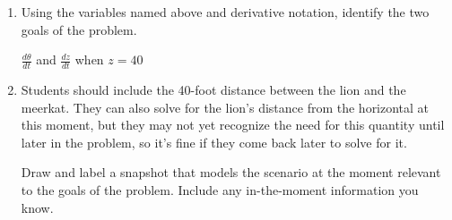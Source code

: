 \documentclass{article}
\begin{document}
\begin{enumerate}
\begin{enumerate}
    \begin{solution}
    \begin{center}
     \end{center}
    \end{solution}
    \vfill\vfill
    \item Using the variables named above and derivative notation, identify the two goals of the problem.
    
    \begin{solution}
        $\frac{d\theta}{dt}$ and $\frac{dz}{dt}$ when $z=40$
    \end{solution}
    \vfill
    \item 
    \begin{workshop}
        Students should include the 40-foot distance between the lion and the meerkat. They can also solve for the lion's distance from the horizontal at this moment, but they may not yet recognize the need for this quantity until later in the problem, so it's fine if they come back later to solve for it.
    \end{workshop}
    Draw and label a snapshot that models the scenario at the moment relevant to the goals of the problem. Include any in-the-moment information you know. 
    
    \begin{solution}
    \begin{center}
\end{center}
\end{solution}
\end{enumerate}
\end{enumerate}
\end{document}
